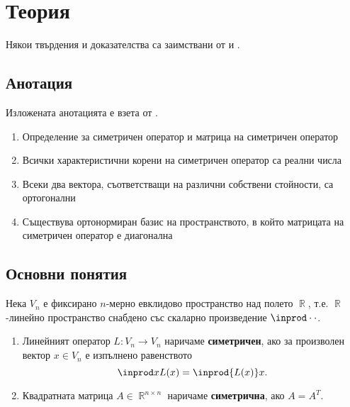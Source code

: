 \documentclass{../../common/topic}
\begin{document}
\maketitle

\section{Теория}

Някои твърдения и доказателства са заимствани от \cite{Knapp2016BasicAlgebra} и \cite{RoyachkiNotes}.

\subsection{Анотация}

Изложената анотацията е взета от \cite{Syllabus}.

\begin{enumerate}
  \item Определение за симетричен оператор и матрица на симетричен оператор
  \item Всички характеристични корени на симетричен оператор са реални числа
  \item Всеки два вектора, съответстващи на различни собствени стойности, са ортогонални
  \item Съществува ортонормиран базис на пространството, в който матрицата на симетричен оператор е диагонална
\end{enumerate}

\subsection{Основни понятия}

Нека \( V_n \) е фиксирано \( n \)-мерно евклидово пространство над полето \( \BbbR \), т.е. \( \BbbR \)-линейно пространство снабдено със скаларно произведение \( \inprod \cdot \cdot \).

\begin{definition}
  \hfill
  \begin{enumerate}
    \item Линейният оператор \( L: V_n \to V_n \) наричаме \textbf{симетричен}, ако за произволен вектор \( x \in V_n \) е изпълнено равенството
    \begin{equation*}
      \inprod x {L(x)} = \inprod {L(x)} x.
    \end{equation*}

    \item Квадратната матрица \( A \in \BbbR^{n \times n} \) наричаме \textbf{симетрична}, ако \( A = A^T \).
  \end{enumerate}
\end{definition}
\end{document}
